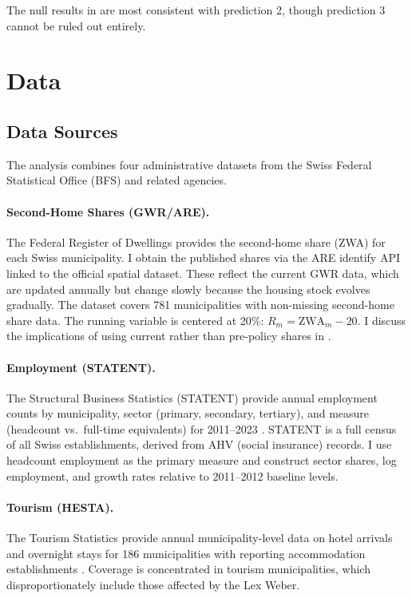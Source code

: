\documentclass[12pt]{article}
\begin{document}
The null results in  are most consistent with prediction 2, though prediction 3 cannot be ruled out entirely.

\section{Data}\label{sec:data}

\subsection{Data Sources}

The analysis combines four administrative datasets from the Swiss Federal Statistical Office (BFS) and related agencies.

\paragraph{Second-Home Shares (GWR/ARE).} The Federal Register of Dwellings provides the second-home share (ZWA) for each Swiss municipality. I obtain the published shares via the ARE identify API linked to the official spatial dataset. These reflect the current GWR data, which are updated annually but change slowly because the housing stock evolves gradually. The dataset covers 781 municipalities with non-missing second-home share data. The running variable is centered at 20\%: $R_m = \text{ZWA}_m - 20$. I discuss the implications of using current rather than pre-policy shares in .

\paragraph{Employment (STATENT).} The Structural Business Statistics (STATENT) provide annual employment counts by municipality, sector (primary, secondary, tertiary), and measure (headcount vs.\ full-time equivalents) for 2011--2023 \citep{bfs2024}. STATENT is a full census of all Swiss establishments, derived from AHV (social insurance) records. I use headcount employment as the primary measure and construct sector shares, log employment, and growth rates relative to 2011--2012 baseline levels.

\paragraph{Tourism (HESTA).} The Tourism Statistics provide annual municipality-level data on hotel arrivals and overnight stays for 186 municipalities with reporting accommodation establishments \citep{bfs2024b}. Coverage is concentrated in tourism municipalities, which disproportionately include those affected by the Lex Weber.
\end{document}
